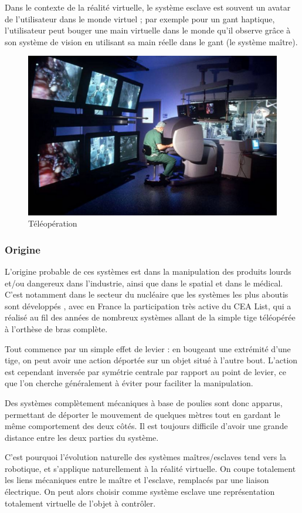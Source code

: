 \documentclass[a4,12pt]{scrartcl}
\begin{document}
Dans le contexte de la réalité virtuelle, le système esclave est souvent un avatar de l'utilisateur dans le monde virtuel ; par exemple pour un gant haptique, l'utilisateur peut bouger une main virtuelle dans le monde qu'il observe grâce à son système de vision en utilisant sa main réelle dans le gant (le système maître).

\begin{figure}[H]
	\centering
	\includegraphics[width=0.6\linewidth]{operation}
	\caption{Téléopération}
	\label{operation}
\end{figure}

\subsubsection{Origine}

L'origine probable de ces systèmes est dans la manipulation des produits lourds et/ou dangereux dans l'industrie, ainsi que dans le spatial et dans le médical. C'est notamment dans le secteur du nucléaire que les systèmes les plus aboutis sont développés \cite{Garrec10}, avec en France la participation très active du CEA List, qui a réalisé au fil des années de nombreux systèmes allant de la simple tige téléopérée à l'orthèse de bras complète.  

Tout commence par un simple effet de levier : en bougeant une extrémité d'une tige, on peut avoir une action déportée sur un objet situé à l'autre bout. L'action est cependant inversée par symétrie centrale par rapport au point de levier, ce que l'on cherche généralement à éviter pour faciliter la manipulation.

Des systèmes complètement mécaniques à base de poulies sont donc apparus, permettant de déporter le mouvement de quelques mètres tout en gardant le même comportement des deux côtés. Il est toujours difficile d'avoir une grande distance entre les deux parties du système.

C'est pourquoi l'évolution naturelle des systèmes maîtres/esclaves tend vers la robotique, et s'applique naturellement à la réalité virtuelle. On coupe totalement les liens mécaniques entre le maître et l'esclave, remplacés par une liaison électrique. On peut alors choisir comme système esclave une représentation totalement virtuelle de l'objet à contrôler.
\end{document}
